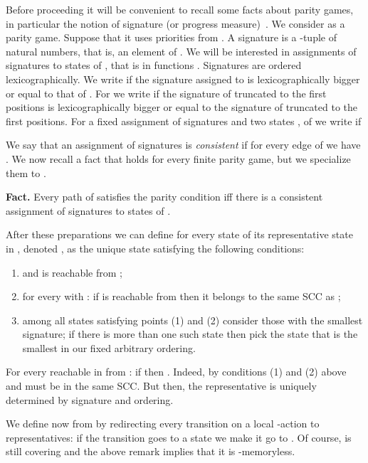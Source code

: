 \documentclass[10pt,a4paper]{article}
\begin{document}
  Before proceeding it will be convenient to recall some facts about
  parity games, in particular the notion of
  signature (or progress measure)~\cite{wal01ic}. We consider  as a
  parity game. Suppose that it uses priorities from
  . A signature is a -tuple of natural numbers,
  that is, an element of . We will be interested in
  assignments of signatures to states of , that is in
  functions . Signatures are ordered
  lexicographically. We write  if the signature
  assigned to  is lexicographically bigger or equal to that of
  . For  we write  if
  the signature of  truncated to the first  positions is
  lexicographically bigger or equal to the signature of  truncated
  to the first  positions.  For a fixed assignment of signatures
   and two states ,  of  we write  if
  
  We say that an assignment of signatures  is
  \emph{consistent} if for every edge  of  we have
  . We now recall a fact that holds for every finite
  parity game, but we specialize them to .

 \noindent
\textbf{Fact.} 
 Every path of  satisfies the parity
  condition iff there is a consistent assignment of signatures to
  states of .


  After these preparations we can define for every state  of
   its
  representative state in , denoted , as the unique
  state  satisfying the following conditions:
  \begin{enumerate}
\item  and  is reachable from ;
\item for every  with : if  is
  reachable from  then it belongs to the same SCC as
  ;
\item among all states satisfying points (1) and (2) consider those
  with the smallest signature; if there is more than one such state
  then pick the state that is the smallest in our fixed arbitrary ordering.
\end{enumerate}


  \begin{remark}\label{rem:rep} 
    For every  reachable in  from : if
     then . Indeed, by
    conditions (1) and (2) above  and  must be
    in the same SCC. But then, the representative is uniquely
    determined by signature and ordering. 
  \end{remark}
  

  We define now  from  by redirecting every
  transition on a local -action to representatives: if the transition
  goes to a state  we make it go to . Of course,
   is still covering and
  the above remark implies that it is -memoryless.
\end{document}
